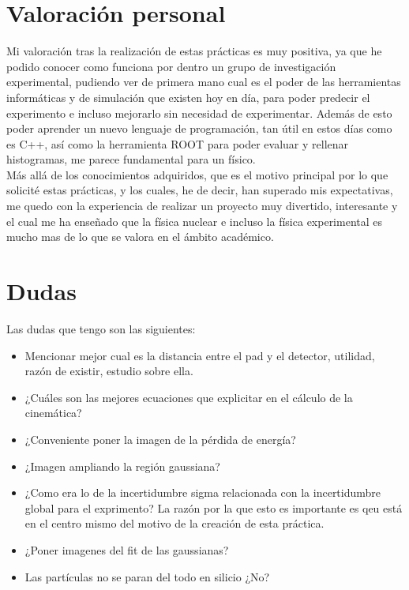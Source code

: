 \documentclass[12pt,a4paper]{article}
\numberwithin{equation}{section}
\numberwithin{figure}{section}
\begin{document}
\section{Valoración personal}

Mi valoración tras la realización de estas prácticas es muy positiva, ya que he podido conocer como funciona por dentro un grupo de investigación experimental, pudiendo ver de primera mano cual es el poder de las herramientas informáticas y de simulación que existen hoy en día, para poder predecir el experimento e incluso mejorarlo sin necesidad de experimentar. Además de esto poder aprender un nuevo lenguaje de programación, tan útil en estos días como es C++, así como la herramienta ROOT para poder evaluar y rellenar histogramas, me parece fundamental para un físico. \\

Más allá de los conocimientos adquiridos, que es el motivo principal por lo que solicité estas prácticas, y los cuales, he de decir, han superado mis expectativas, me quedo con la experiencia de realizar un proyecto muy divertido, interesante y el cual me ha enseñado que la física nuclear e incluso la física experimental es mucho mas de lo que se valora en el ámbito académico.

\section*{Dudas}

Las dudas que tengo son las siguientes:

\begin{itemize}
    \item Mencionar mejor cual es la distancia entre el pad y el detector, utilidad, razón de existir, estudio sobre ella. 
    \item ¿Cuáles son las mejores ecuaciones que explicitar en el cálculo de la cinemática?
    \item ¿Conveniente poner la imagen de la pérdida de energía?
    \item ¿Imagen ampliando la región gaussiana? 
    \item {\color{red} ¿Como era lo de la incertidumbre sigma relacionada con la incertidumbre global para el exprimento?} La razón por la que esto es importante es qeu está en el centro mismo del motivo de la creación de esta práctica. 
    \item ¿Poner imagenes del fit de las gaussianas?
    \item Las partículas no se paran del todo en silicio ¿No?
    
\end{itemize}
\end{document}

